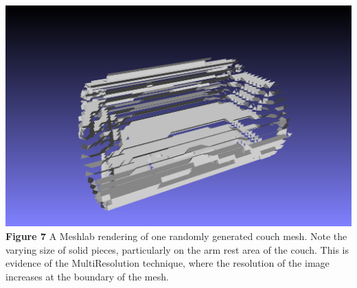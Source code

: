 \documentclass[11pt]{article}
\begin{document}
\includegraphics[scale=0.4]{./benchImages/couch.png}\\
\caption{\hypertarget{fig7}{\textbf{Figure 7}} A Meshlab rendering of one randomly generated couch mesh. Note the varying size of solid pieces, particularly on the arm rest area of the couch. This is evidence of the MultiResolution technique, where the resolution of the image increases at the boundary of the mesh. }
\end{document}
